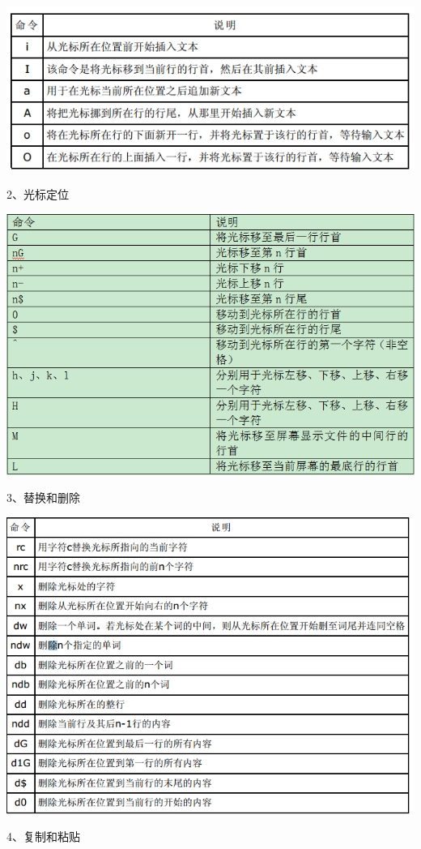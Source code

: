 \documentclass[letterpaper,10pt]{sphinxmanual}
\begin{document}
\includegraphics{insert.png}

2、光标定位

\includegraphics{Location.png}

3、替换和删除

\includegraphics{replace.png}

4、复制和粘贴
\end{document}
